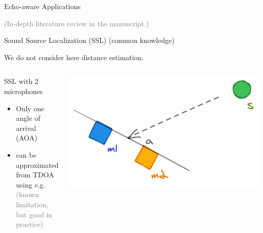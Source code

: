 \begin{frame}[t]{Echo-aware Applications \hfill\faBook}
    \vspace{-3mm}
    \begin{center}
        \textcolor{gray}{\small (In-depth literature review in the manuscript.)}
    \end{center}
\end{frame}

\begin{frame}{Sound Source Localization (SSL) {\hfill\small (common knowledge)} \faBook}

    \faAlert We do not consider here distance estimation.

    \begin{columns}[T,onlytextwidth]
        \begin{block}{SSL with 2 microphones}
            \begin{itemize}
                \item Only one angle of arrival (\alert{AOA})\iconAOA
                \item can be approximated from \alert{TDOA} using e.g. \GCCPHAT\footnotemark[1]
                \\\textcolor{gray}{\small (known limitation, but good in practice)}
            \end{itemize}
        \end{block}
        \includegraphics[width=\textwidth]{figures/1d_ssl.png}
    \end{columns}
    \pause


\end{frame}
